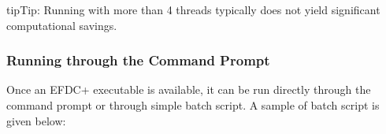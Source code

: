 \documentclass[letterpaper,10pt,english]{sphinxmanual}
\begin{document}
\begin{sphinxadmonition}{tip}{Tip:}
Running with more than 4 threads typically does not yield significant computational savings.
\end{sphinxadmonition}


\subsubsection{Running through the Command Prompt}
\label{\detokenize{started/running:running-through-the-command-prompt}}
Once an EFDC+ executable is available, it can be run directly through the command prompt or through simple batch script.  A sample of batch script is given below:

\begin{sphinxVerbatim}[commandchars=\\\{\}]
 

     

 

  

\end{sphinxVerbatim}
\end{document}
